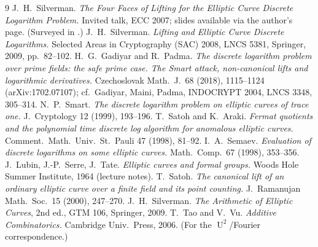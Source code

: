 \documentclass[11pt]{article}
\theoremstyle{definition}
\DeclareMathOperator{\Uk}{U}
\begin{document}
\begin{thebibliography}{9}
 J.~H.~Silverman. \emph{The Four Faces of
Lifting for the Elliptic Curve Discrete Logarithm Problem.} Invited talk,
ECC 2007; slides available via the author's page. (Surveyed in
\cite{silvermanlift}.)
 J.~H.~Silverman. \emph{Lifting and Elliptic Curve
Discrete Logarithms.} Selected Areas in Cryptography (SAC) 2008, LNCS
5381, Springer, 2009, pp.\ 82--102.
 H.~G.~Gadiyar and R.~Padma. \emph{The discrete
logarithm problem over prime fields: the safe prime case. The Smart
attack, non-canonical lifts and logarithmic derivatives.} Czechoslovak Math.\ J.\ 68 (2018),
1115--1124 (arXiv:1702.07107); cf.\ Gadiyar, Maini, Padma, INDOCRYPT 2004,
LNCS 3348, 305--314.
 N.~P.~Smart. \emph{The discrete logarithm problem on
elliptic curves of trace one.} J.~Cryptology 12 (1999), 193--196.
 T.~Satoh and K.~Araki. \emph{Fermat quotients and
the polynomial time discrete log algorithm for anomalous elliptic
curves.} Comment.\ Math.\ Univ.\ St.\ Pauli 47 (1998), 81--92.
 I.~A.~Semaev. \emph{Evaluation of discrete logarithms on
some elliptic curves.} Math.\ Comp.\ 67 (1998), 353--356.
 J.~Lubin, J.-P.~Serre, J.~Tate. \emph{Elliptic curves and
formal groups.} Woods Hole Summer Institute, 1964 (lecture notes).
 T.~Satoh. \emph{The canonical lift of an ordinary
elliptic curve over a finite field and its point counting.} J.~Ramanujan
Math.\ Soc.\ 15 (2000), 247--270.
 J.~H.~Silverman. \emph{The Arithmetic of Elliptic
Curves}, 2nd ed., GTM 106, Springer, 2009.
 T.~Tao and V.~Vu. \emph{Additive Combinatorics.}
Cambridge Univ.\ Press, 2006. (For the $\Uk^2$/Fourier correspondence.)
\end{thebibliography}
\end{document}

